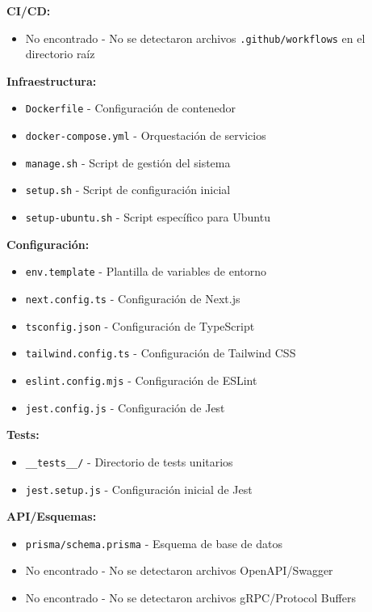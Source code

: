\documentclass[12pt,a4paper]{article}
\begin{document}
\textbf{CI/CD:}
\begin{itemize}
    \item No encontrado - No se detectaron archivos \texttt{.github/workflows} en el directorio raíz
\end{itemize}

\textbf{Infraestructura:}
\begin{itemize}
    \item \texttt{Dockerfile} - Configuración de contenedor
    \item \texttt{docker-compose.yml} - Orquestación de servicios
    \item \texttt{manage.sh} - Script de gestión del sistema
    \item \texttt{setup.sh} - Script de configuración inicial
    \item \texttt{setup-ubuntu.sh} - Script específico para Ubuntu
\end{itemize}

\textbf{Configuración:}
\begin{itemize}
    \item \texttt{env.template} - Plantilla de variables de entorno
    \item \texttt{next.config.ts} - Configuración de Next.js
    \item \texttt{tsconfig.json} - Configuración de TypeScript
    \item \texttt{tailwind.config.ts} - Configuración de Tailwind CSS
    \item \texttt{eslint.config.mjs} - Configuración de ESLint
    \item \texttt{jest.config.js} - Configuración de Jest
\end{itemize}

\textbf{Tests:}
\begin{itemize}
    \item \texttt{\_\_tests\_\_/} - Directorio de tests unitarios
    \item \texttt{jest.setup.js} - Configuración inicial de Jest
\end{itemize}

\textbf{API/Esquemas:}
\begin{itemize}
    \item \texttt{prisma/schema.prisma} - Esquema de base de datos
    \item No encontrado - No se detectaron archivos OpenAPI/Swagger
    \item No encontrado - No se detectaron archivos gRPC/Protocol Buffers
\end{itemize}
\end{document}
